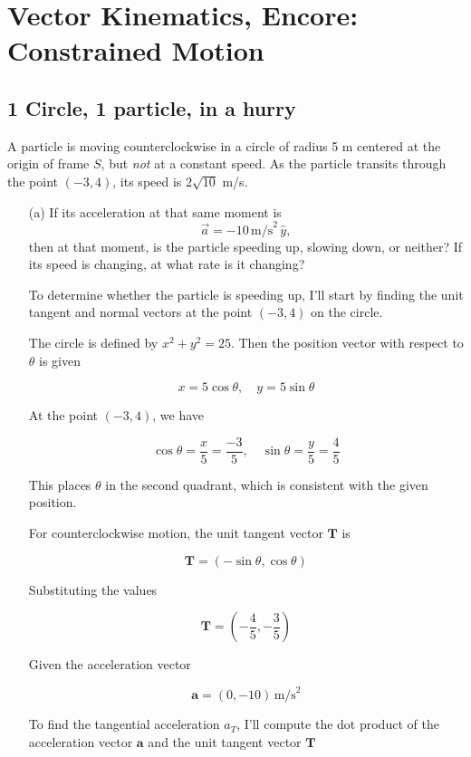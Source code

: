 \documentclass[12pt]{article}
\begin{document}
\section{Vector Kinematics, Encore: Constrained Motion}

\subsection{1 Circle, 1 particle, in a hurry}
A particle is moving counterclockwise in a circle of radius 5 m centered at the origin of frame $S$, but \textit{not} at a constant speed. As the particle transits through the point $(-3, 4)$, its speed is $2\sqrt{10}$ m/s.

\begin{enumerate}
    \item[(a)] If its acceleration at that same moment is
    \[
    \vec{a} = -10 \, \text{m/s}^2 \, \hat{y},
    \]
    then at that moment, is the particle speeding up, slowing down, or neither? If its speed is changing, at what rate is it changing?
    
    To determine whether the particle is speeding up, I'll start by finding the unit tangent and normal vectors at the point \((-3, 4)\) on the circle.

The circle is defined by \( x^2 + y^2 = 25 \). Then the position vector with respect to \(\theta\) is given

\[
x = 5 \cos \theta, \quad y = 5 \sin \theta
\]

At the point \((-3, 4)\),  we have

\[
\cos \theta = \frac{x}{5} = \frac{-3}{5}, \quad \sin \theta = \frac{y}{5} = \frac{4}{5}
\]

This places \(\theta\) in the second quadrant, which is consistent with the given position.

For counterclockwise motion, the unit tangent vector \(\mathbf{T}\) is

\[
\mathbf{T} = \left( -\sin \theta, \cos \theta \right)
\]

Substituting the values

\[
\mathbf{T} = \left( -\frac{4}{5}, -\frac{3}{5} \right)
\]

Given the acceleration vector

\[
\mathbf{a} = \left( 0, -10 \right) \, \text{m/s}^2
\]

To find the tangential acceleration \( a_T \), I'll compute the dot product of the acceleration vector \(\mathbf{a}\) and the unit tangent vector \(\mathbf{T}\)


\end{enumerate}
\end{document}
